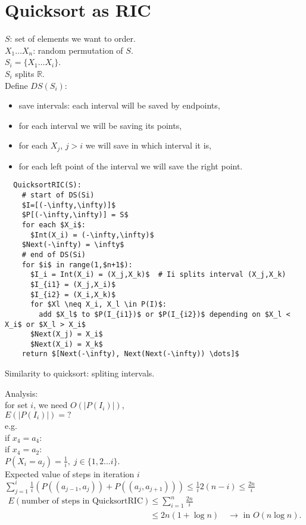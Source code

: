 \documentclass[a4paper, 12pt]{book}
\theoremstyle{definition}
\theoremstyle{remark}
\newcommand{\R}{\mathbb{R}}
\begin{document}
\section{Quicksort as RIC}

$S$: set of elements we want to order. \\
$X_1 \dots X_n$: random permutation of $S$. \\
$S_i = \{X_1 \dots X_i\}$. \\
$S_i$ splits $\R$. \\
Define $DS(S_i)$:
\begin{itemize}
  \item save intervals: each interval will be saved by endpoints,
  \item for each interval we will be saving its points,
  \item for each $X_j$, $j > i$ we will save in which interval it is,
  \item for each left point of the interval we will save the right point.
\end{itemize}
\begin{lstlisting}
  QuicksortRIC(S):
    # start of DS(Si)
    $I=[(-\infty,\infty)]$
    $P[(-\infty,\infty)] = S$
    for each $X_i$:
      $Int(X_i) = (-\infty,\infty)$
    $Next(-\infty) = \infty$
    # end of DS(Si)
    for $i$ in range(1,$n+1$):
      $I_i = Int(X_i) = (X_j,X_k)$  # Ii splits interval (X_j,X_k)
      $I_{i1} = (X_j,X_i)$
      $I_{i2} = (X_i,X_k)$
      for $Xl \neq X_i, X_l \in P(I)$: 
        add $X_l$ to $P(I_{i1})$ or $P(I_{i2})$ depending on $X_l < X_i$ or $X_l > X_i$
      $Next(X_j) = X_i$
      $Next(X_i) = X_k$
    return $[Next(-\infty), Next(Next(-\infty)) \dots]$
\end{lstlisting}
Similarity to quicksort: spliting intervals.



Analysis: \\
for set $i$, we need $O\left(|P(I_i)|\right)$, \\
$E\left(|P(I_i)|\right) = ?$ \\
e.g. \\
if $x_4 = a_4$: \\
if $x_4 = a_2$: \\
$P(X_i = a_j) = \frac{1}{i}, \; j \in \{1, 2 \dots i\}$. \\
Expected value of steps in iteration $i$ \\
$\sum_{j=1}^{i} \frac{1}{i} \left(P\left((a_{j-1},a_j)\right) + P\left((a_j,a_{j+1})\right)\right)
\leq \frac{1}{i} 2 (n-i) \leq \frac{2n}{i}$ \\
\begin{align*}
  E \left(\text{number of steps in QuicksortRIC}\right)
  &\leq \sum_{i=1}^{n} \frac{2n}{i} \\
  &\leq 2n (1 + \log n) \quad \to \text{ in } O(n \log n).
\end{align*}
\end{document}
